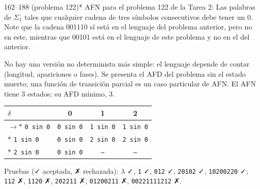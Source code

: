 \documentclass[11pt]{article}
\begin{document}
\begin{ejercicio}{162--188 (problema 122)}{*}
AFN para el problema 122 de la Tarea 2: Las palabras de $\Sigma_1$ tales que cualquier cadena de tres símbolos consecutivos debe tener un 0. Note que la cadena 001110 sí está en el lenguaje del problema anterior, pero no en este, mientras que 00101 está en el lenguaje de este problema y no en el del anterior.
\end{ejercicio}
\proc No hay una versión no determinista más simple: el lenguaje depende de contar (longitud, apariciones o fases). Se presenta el AFD del problema sin el estado muerto; una función de transición parcial es un caso particular de AFN. El AFN tiene 3 estados; su AFD mínimo, 3.
\begin{center}\small\begin{tabular}{lccc}\toprule
$\delta$ & 0 & 1 & 2 \\\midrule
$\to$$*$ \texttt{0 sin 0} & \texttt{0 sin 0} & \texttt{1 sin 0} & \texttt{1 sin 0} \\
$*$ \texttt{1 sin 0} & \texttt{0 sin 0} & \texttt{2 sin 0} & \texttt{2 sin 0} \\
$*$ \texttt{2 sin 0} & \texttt{0 sin 0} & \texttt{--} & \texttt{--} \\
\bottomrule\end{tabular}\end{center}
Pruebas (✓ aceptada, ✗ rechazada): $\lambda$ ✓, \texttt{1} ✓, \texttt{012} ✓, \texttt{20102} ✓, \texttt{10200220} ✓; \texttt{112} ✗, \texttt{1120} ✗, \texttt{202211} ✗, \texttt{01200211} ✗, \texttt{00221111212} ✗.
\end{document}

